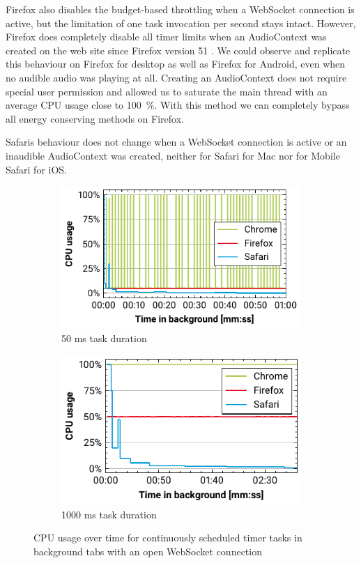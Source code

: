 \documentclass[
	ruledheaders=section,%
	class=report,%
	thesis={type=bachelor},%
	accentcolor=9c,%
	custommargins=true,%
	marginpar=false,%
	parskip=half-,%
	fontsize=11pt,%
]{tudapub}
\begin{document}
  Firefox also disables the budget-based throttling when a WebSocket connection is active, but the limitation of one task invocation per second stays intact. However, Firefox does completely disable all timer limits when an AudioContext was created on the web site since Firefox version 51 \cite{firefox-audiocontext-exemption}. We could observe and replicate this behaviour on Firefox for desktop as well as Firefox for Android, even when no audible audio was playing at all. Creating an AudioContext does not require special user permission and allowed us to saturate the main thread with an average CPU usage close to 100~\%. With this method we can completely bypass all energy conserving methods on Firefox.

  Safaris behaviour does not change when a WebSocket connection is active or an inaudible AudioContext was created, neither for Safari for Mac nor for Mobile Safari for iOS.

  \begin{figure}
    \begin{subfigure}[t]{0.5\textwidth}
      \includegraphics[width=\textwidth]{images/websocket-50.pdf}
      \caption{50 ms task duration}
    \end{subfigure}
    \hfill
    \begin{subfigure}[t]{0.5\textwidth}
      \includegraphics[width=\textwidth]{images/websocket-1000.pdf}
      \caption{1000 ms task duration}
    \end{subfigure}

    \caption{CPU usage over time for continuously scheduled timer tasks in background tabs with an open WebSocket connection}
    \label{fig:websocket}
  \end{figure}
\end{document}
